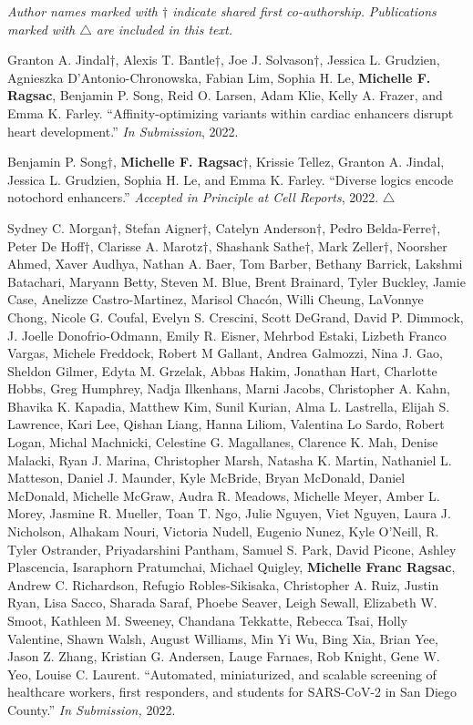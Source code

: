 \documentclass[11pt]{formatting-template}
\begin{document}
\begin{vita}
\noindent \textit{Author names marked with $\dagger$ indicate shared first co-authorship.} \newline
\noindent \textit{Publications marked with $\triangle$ are included in this text.} \newline

\noindent Granton A. Jindal$\dagger$, Alexis T. Bantle$\dagger$, Joe J. Solvason$\dagger$, Jessica L. Grudzien, Agnieszka D'Antonio-Chronowska, Fabian Lim, Sophia H. Le, \textbf{Michelle F. Ragsac}, Benjamin P. Song, Reid O. Larsen, Adam Klie, Kelly A. Frazer, and Emma K. Farley. ``Affinity-optimizing variants within cardiac enhancers disrupt heart development.'' \textit{In Submission}, 2022. \newline

\noindent Benjamin P. Song$\dagger$, \textbf{Michelle F. Ragsac}$\dagger$, Krissie Tellez, Granton A. Jindal, Jessica L. Grudzien, Sophia H. Le, and Emma K. Farley. ``Diverse logics encode notochord enhancers.'' \textit{Accepted in Principle at Cell Reports}, 2022. $\triangle$ \newline

\noindent Sydney C. Morgan$\dagger$, Stefan Aigner$\dagger$, Catelyn Anderson$\dagger$, Pedro Belda-Ferre$\dagger$, Peter De Hoff$\dagger$, Clarisse A. Marotz$\dagger$, Shashank Sathe$\dagger$, Mark Zeller$\dagger$, Noorsher Ahmed, Xaver Audhya, Nathan A. Baer, Tom Barber, Bethany Barrick, Lakshmi Batachari, Maryann Betty, Steven M. Blue, Brent Brainard, Tyler Buckley, Jamie Case, Anelizze Castro-Martinez, Marisol Chacón, Willi Cheung, LaVonnye Chong, Nicole G. Coufal, Evelyn S. Crescini, Scott DeGrand, David P. Dimmock, J. Joelle Donofrio-Odmann, Emily R. Eisner, Mehrbod Estaki, Lizbeth Franco Vargas, Michele Freddock, Robert M Gallant, Andrea Galmozzi, Nina J. Gao, Sheldon Gilmer, Edyta M. Grzelak, Abbas Hakim, Jonathan Hart, Charlotte Hobbs, Greg Humphrey, Nadja Ilkenhans, Marni Jacobs, Christopher A. Kahn, Bhavika K. Kapadia, Matthew Kim, Sunil Kurian, Alma L. Lastrella, Elijah S. Lawrence, Kari Lee, Qishan Liang, Hanna Liliom, Valentina Lo Sardo, Robert Logan, Michal Machnicki, Celestine G. Magallanes, Clarence K. Mah, Denise Malacki, Ryan J. Marina, Christopher Marsh, Natasha K. Martin, Nathaniel L. Matteson, Daniel J. Maunder, Kyle McBride, Bryan McDonald, Daniel McDonald, Michelle McGraw, Audra R. Meadows, Michelle Meyer, Amber L. Morey, Jasmine R. Mueller, Toan T. Ngo, Julie Nguyen, Viet Nguyen, Laura J. Nicholson, Alhakam Nouri, Victoria Nudell, Eugenio Nunez, Kyle O'Neill, R. Tyler Ostrander, Priyadarshini Pantham, Samuel S. Park, David Picone, Ashley Plascencia, Isaraphorn Pratumchai, Michael Quigley, \textbf{Michelle Franc Ragsac}, Andrew C. Richardson, Refugio Robles-Sikisaka, Christopher A. Ruiz, Justin Ryan, Lisa Sacco, Sharada Saraf, Phoebe Seaver, Leigh Sewall, Elizabeth W. Smoot, Kathleen M. Sweeney, Chandana Tekkatte, Rebecca Tsai, Holly Valentine, Shawn Walsh, August Williams, Min Yi Wu, Bing Xia, Brian Yee, Jason Z. Zhang, Kristian G. Andersen, Lauge Farnaes, Rob Knight, Gene W. Yeo, Louise C. Laurent. ``Automated, miniaturized, and scalable screening of healthcare workers, first responders, and students for SARS-CoV-2 in San Diego County.'' \textit{In Submission,} 2022.


\end{vita}
\end{document}
